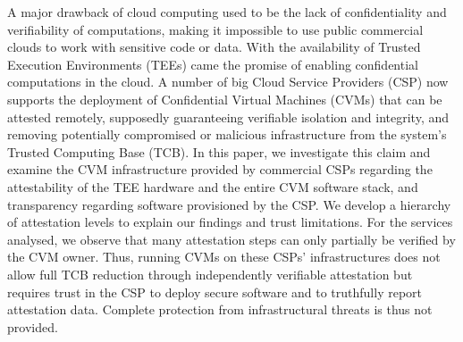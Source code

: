 A major drawback of cloud computing used to be the lack of confidentiality and
verifiability of computations, making it impossible to use public commercial
clouds to work with sensitive code or data. With the availability of Trusted
Execution Environments (TEEs) came the promise of enabling confidential
computations in the cloud. A number of big Cloud Service Providers (CSP) now
supports the deployment of Confidential Virtual Machines (CVMs) that can be
attested remotely, supposedly guaranteeing verifiable isolation and integrity,
and removing potentially compromised or malicious infrastructure from the
system's Trusted Computing Base (TCB). In this paper, we investigate this claim
and examine the CVM infrastructure provided by commercial CSPs regarding the
attestability of the TEE hardware and the entire CVM software stack, and
transparency regarding software provisioned by the CSP. We develop a hierarchy
of attestation levels to explain our findings and trust limitations. For the
services analysed, we observe that many attestation steps can only partially be
verified by the CVM owner. Thus, running CVMs on these CSPs' infrastructures
does not allow full TCB reduction through independently verifiable attestation
but requires trust in the CSP to deploy secure software and to truthfully report
attestation data. Complete protection from infrastructural threats is thus not
provided.
